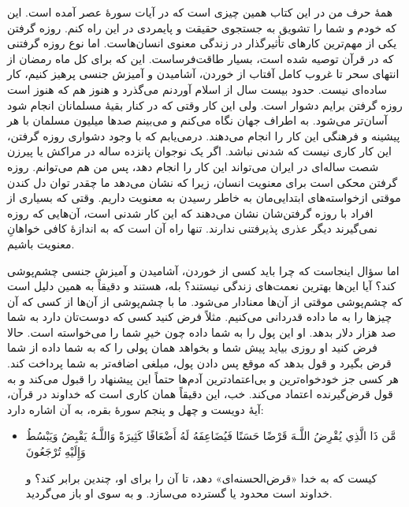 همهٔ حرف من در این کتاب همین چیزی است که در آیات سورهٔ عصر آمده است. این که خودم و شما را تشویق به جستجوی حقیقت و پایمردی در این راه کنم.  روزه گرفتن یکی از مهم‌ترین کارهای تأثیرگذار در زندگی معنوی انسان‌هاست. اما نوع روزه گرفتنی که در قرآن توصیه شده است، بسیار طاقت‌فرساست. این که برای کل ماه رمضان از انتهای سحر تا غروب کامل آفتاب از خوردن، آشامیدن و آمیزش جنسی پرهیز کنیم، کار ساده‌ای نیست. حدود بیست سال از اسلام آوردنم می‌گذرد و هنوز هم که هنوز است روزه گرفتن برایم دشوار است. ولی این کار وقتی که در کنار بقیهٔ مسلمانان انجام شود آسان‌تر ‌‌می‌شود. به اطراف جهان نگاه ‌می‌کنم و ‌‌می‌بینم صدها میلیون مسلمان با هر پیشینه و فرهنگی این کار را انجام می‌دهند. درمی‌یابم که  با وجود دشواری روزه گرفتن،  این کار کاری نیست که شدنی نباشد. اگر یک نوجوان پانزده ساله در مراکش یا پیرزن شصت ساله‌ای در ایران می‌تواند این کار را انجام دهد، پس من هم می‌توانم. روزه گرفتن محکی است برای معنویت انسان، زیرا که نشان می‌دهد  ما چقدر توان  دل کندن موقتی  ازخواسته‌های ابتدایی‌مان به خاطر رسیدن به معنویت داریم. وقتی که بسیاری از افراد با روزه گرفتن‌شان نشان می‌دهند که این کار شدنی است، آن‌هایی که روزه نمی‌گیرند دیگر عذری پذیرفتنی ندارند. تنها راه آن است که به اندازهٔ کافی خواهانِ معنویت باشیم.


اما سؤال اینجاست که چرا باید کسی از خوردن، آشامیدن و آمیزش جنسی چشم‌پوشی کند؟ آیا این‌ها بهترین نعمت‌های زندگی نیستند؟ بله، هستند و دقیقاً به همین دلیل است که چشم‌پوشی موقتی از آن‌ها معنادار می‌شود. ما با چشم‌پوشی از آن‌ها از کسی که آن چیزها را به ما داده قدردانی می‌کنیم. مثلاً فرض کنید کسی که دوست‌تان دارد به شما صد هزار دلار بدهد. او این پول را به شما داده چون خیرِ شما را می‌خواسته است. حالا فرض کنید او روزی بیاید پیش شما و بخواهد همان پولی را که به شما داده از شما قرض بگیرد و قول بدهد که موقع پس دادن پول، مبلغی اضافه‌تر به شما پرداخت کند. هر کسی جز خودخواه‌ترین و بی‌اعتمادترین آدم‌ها حتماً این پیشنهاد را قبول می‌کند و به قول قرض‌گیرنده اعتماد می‌کند. خب، این دقیقاً همان کاری است که خداوند در قرآن، آیهٔ دویست و چهل و پنجم سورهٔ بقره، به آن اشاره دارد:

\begin{itemize}
	\item[]
	{
		مَّن ذَا الَّذِي يُقْرِضُ اللَّـهَ قَرْضًا حَسَنًا فَيُضَاعِفَهُ لَهُ أَضْعَافًا كَثِيرَةً  وَاللَّـهُ يَقْبِضُ وَيَبْسُطُ وَإِلَيْهِ تُرْجَعُونَ}
	
	{
		کیست که به خدا «قرض‌الحسنه‌ای» دهد،  تا آن را برای او، چندین برابر کند؟ و خداوند است محدود یا گسترده می‌سازد. و به سوی او باز می‌گردید.}
\end{itemize}

